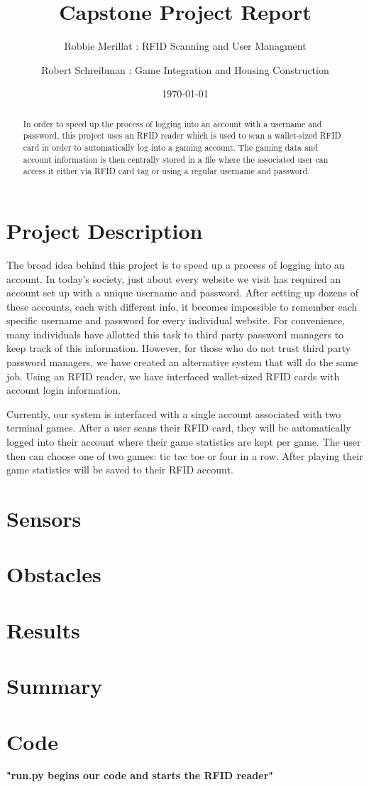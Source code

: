 \documentclass[notitlepage,11pt]{article}
\title{Capstone Project Report}
\author{Robbie Merillat : RFID Scanning and User Managment}
\author{Robert Schreibman : Game Integration and Housing Construction}
\date{\today}
\begin{document}
    \maketitle
    \begin{abstract}
        In order to speed up the process of logging into an account with a 
        username and password, this project uses an RFID reader which is 
        used to scan a wallet-sized RFID card in order to automatically log 
        into a gaming account. The gaming data and account information is then 
        centrally stored in a file where the associated user can access it either 
        via RFID card tag or using a regular username and password.
    \end{abstract}

    \newpage

    \section{Project Description}
        The broad idea behind this project is to speed up a process of logging into 
        an account. In today’s society, just about every website we visit has required 
        an account set up with a unique username and password. After setting up dozens of 
        these accounts, each with different info, it becomes impossible to remember each 
        specific username and password for every individual website. For convenience, 
        many individuals have allotted this task to third party password managers to 
        keep track of this information. However, for those who do not trust third 
        party password managers, we have created an alternative system that will do 
        the same job. Using an RFID reader, we have interfaced wallet-sized RFID 
        cards with account login information. 

        Currently, our system is interfaced with a single account associated with two terminal games. After a user scans their RFID card, they will be automatically logged into their account where their game statistics are kept per game. The user then can choose one of two games: tic tac toe or four in a row. After playing their game statistics will be saved to their RFID account.
    \section{Sensors}

    \section{Obstacles}

    \section{Results}

    \section{Summary}

    \section{Code}
        \textbf{"run.py begins our code and starts the RFID reader"}
        
\end{document}
